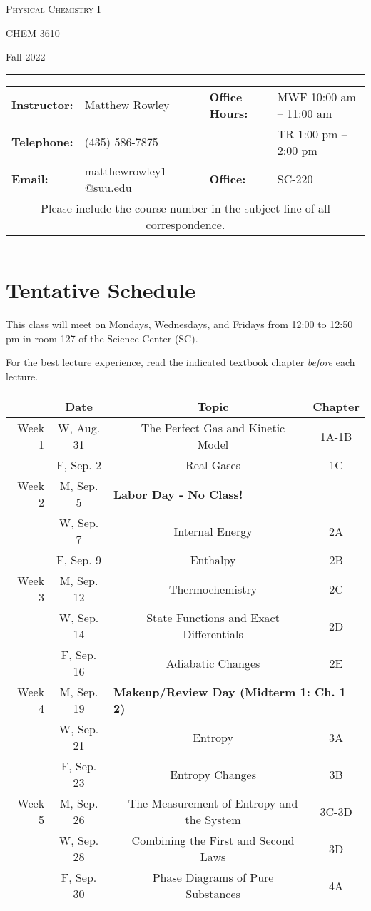 \documentclass[12pt, letterpaper]{article}
\begin{document}
\begin{center}
{\Large \textsc{Physical Chemistry I}}

CHEM 3610
\end{center}
\begin{center}
	{\large Fall 2022}
\end{center}
\begin{center}
	\rule{0.99\textwidth}{0.4pt}
	\begin{tabular}{llcll}
		\textbf{Instructor:} & Matthew Rowley           &  & \textbf{Office Hours:} & MWF 10:00 am -- 11:00 am \\
		\textbf{Telephone:}  & (435) 586-7875           &  &                        & TR 1:00 pm -- 2:00 pm    \\
		\textbf{Email:}      & matthewrowley$1$@suu.edu &  & \textbf{Office:}       & SC-220                   \\
		\multicolumn{5}{c}{Please include the course number in the subject line of all correspondence.}
	\end{tabular}
	\rule{0.99\textwidth}{0.4pt}
\end{center}

\section*{Tentative Schedule}
This class will meet on Mondays, Wednesdays, and Fridays from 12:00 to 12:50 pm in room 127 of the Science Center (SC).

\noindent For the best lecture experience, read the indicated textbook chapter \emph{before} each lecture.

\noindent
\begin{tabular}{rcccc}
& Date && Topic & Chapter\\
\midrule
Week 1 & W, Aug. 31&& The Perfect Gas and Kinetic Model & 1A-1B\\
& F, Sep. 2&& Real Gases & 1C\\
\midrule
Week 2 & M, Sep. 5& \multicolumn{3}{l}{\textbf{Labor Day - No Class!}}\\
& W, Sep. 7&& Internal Energy & 2A\\
& F, Sep. 9&& Enthalpy & 2B\\
\midrule
Week 3 & M, Sep. 12&& Thermochemistry & 2C\\
& W, Sep. 14&& State Functions and Exact Differentials & 2D\\
& F, Sep. 16&& Adiabatic Changes & 2E\\
\midrule
Week 4 & M, Sep. 19& \multicolumn{3}{l}{\textbf{Makeup/Review Day (Midterm 1: Ch. 1--2)}}\\
& W, Sep. 21&& Entropy & 3A\\
& F, Sep. 23&& Entropy Changes & 3B\\
\midrule
Week 5 & M, Sep. 26&& The Measurement of Entropy and the System & 3C-3D\\
& W, Sep. 28&& Combining the First and Second Laws & 3D\\
& F, Sep. 30&& Phase Diagrams of Pure Substances & 4A\\
\end{tabular}
\end{document}
